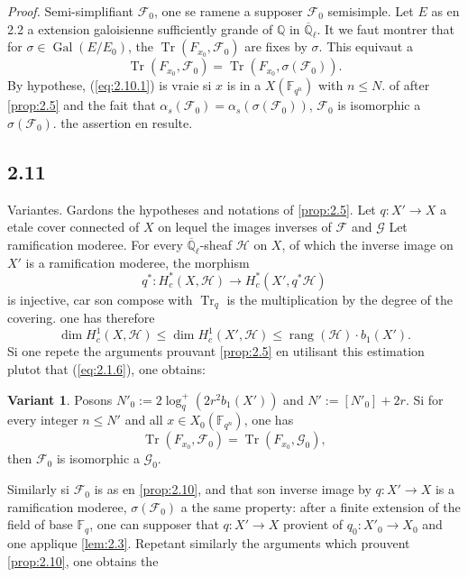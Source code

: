 \documentclass[11pt,a4paper]{article}
\theoremstyle{plain}
\theoremstyle{definition}
\newtheorem{variante}[theorem]{Variant}
\DeclareMathOperator{\Gal}{Gal}
\DeclareMathOperator{\tr}{Tr}
\DeclareMathOperator{\rang}{rang}
\begin{document}
\noindent\textit{Proof.} Semi-simplifiant $\mathcal{F}_0$, one se ramene a supposer $\mathcal{F}_0$ semisimple. Let $E$ as en 2.2 a extension galoisienne sufficiently grande of $\mathbb{Q}$ in $\overline{\mathbb{Q}}_\ell$. It we faut montrer that for $\sigma \in \Gal(E/E_0)$, the $\tr(F_{x_0}, \mathcal{F}_0)$ are fixes by $\sigma$. This equivaut a
\begin{equation}\label{eq:2.10.1}
\tr(F_{x_0}, \mathcal{F}_0) = \tr(F_{x_0}, \sigma(\mathcal{F}_0)).
\end{equation}
By hypothese, (\ref{eq:2.10.1}) is vraie si $x$ is in a $X(\mathbb{F}_{q^n})$ with $n \leq N$. of after \ref{prop:2.5} and the fait that $\alpha_s(\mathcal{F}_0) = \alpha_s(\sigma(\mathcal{F}_0))$, $\mathcal{F}_0$ is isomorphic a $\sigma(\mathcal{F}_0)$. the assertion en resulte.

\subsection{2.11}

Variantes. Gardons the hypotheses and notations of \ref{prop:2.5}. Let $q: X' \to X$ a etale cover connected of $X$ on lequel the images inverses of $\mathcal{F}$ and $\mathcal{G}$ Let ramification moderee. For every $\overline{\mathbb{Q}}_\ell$-sheaf $\mathcal{H}$ on $X$, of which the inverse image on $X'$ is a ramification moderee, the morphism
\[
q^*: H_c^*(X, \mathcal{H}) \to H_c^*(X', q^*\mathcal{H})
\]
is injective, car son compose with $\tr_q$ is the multiplication by the degree of the covering. one has therefore
\[
\dim H_c^1(X, \mathcal{H}) \leq \dim H_c^1(X', \mathcal{H}) \leq \rang(\mathcal{H}) \cdot b_1(X').
\]
Si one repete the arguments prouvant \ref{prop:2.5} en utilisant this estimation plutot that (\ref{eq:2.1.6}), one obtains:

\begin{variante}\label{var:2.12}
Posons $N'_0 := 2\log_q^+(2r^2 b_1(X'))$ and $N' := [N'_0]+2r$. Si for every integer $n \leq N'$ and all $x \in X_0(\mathbb{F}_{q^n})$, one has
\[
\tr(F_{x_0}, \mathcal{F}_0) = \tr(F_{x_0}, \mathcal{G}_0),
\]
then $\mathcal{F}_0$ is isomorphic a $\mathcal{G}_0$.
\end{variante}

Similarly si $\mathcal{F}_0$ is as en \ref{prop:2.10}, and that son inverse image by $q: X' \to X$ is a ramification moderee, $\sigma(\mathcal{F}_0)$ a the same property: after a finite extension of the field of base $\mathbb{F}_q$, one can supposer that $q: X' \to X$ provient of $q_0: X'_0 \to X_0$ and one applique \ref{lem:2.3}. Repetant similarly the arguments which prouvent \ref{prop:2.10}, one obtains the
\end{document}
